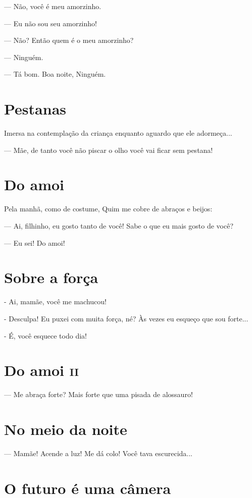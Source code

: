 {{--- Não, você é meu amorzinho.

--- Eu não sou seu amorzinho!

--- Não? Então quem é o meu amorzinho?

--- Ninguém.

--- Tá bom. Boa noite, Ninguém.

\chapter{Pestanas}\label{pestanas}

Imersa na contemplação da criança enquanto aguardo que ele adormeça...

--- Mãe, de tanto você não piscar o olho você vai ficar sem pestana!

\chapter{Do amoi}\label{do-amoi}

Pela manhã, como de costume, Quim me cobre de abraços e beijos:

--- Ai, filhinho, eu gosto tanto de você! Sabe o que eu mais gosto de
você?

--- Eu sei! Do amoi!

\chapter{Sobre a força}

- Ai, mamãe, você me machucou!

- Desculpa! Eu puxei com muita força, né? Às vezes eu esqueço que sou
forte...

- É, você esquece todo dia!

\chapter{Do amoi \textsc{ii}}

--- Me abraça forte? Mais forte que uma pisada de alossauro!

\chapter{No meio da noite}\label{no-meio-da-noite}

--- Mamãe! Acende a luz! Me dá colo! Você tava escurecida...

\chapter{O futuro é uma câmera}\label{o-futuro-uxe9-uma-cuxe2mera}

}}
